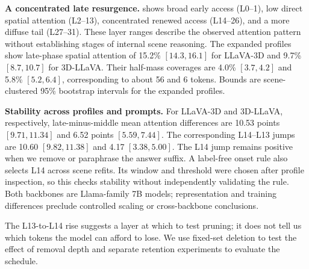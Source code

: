 \textbf{A concentrated late resurgence.}  shows broad early access (L0--1), low direct spatial attention (L2--13), concentrated renewed access (L14--26), and a more diffuse tail (L27--31). These layer ranges describe the observed attention pattern without establishing stages of internal scene reasoning. The expanded profiles show late-phase spatial attention of 15.2\% $[14.3,16.1]$ for LLaVA-3D and 9.7\% $[8.7,10.7]$ for 3D-LLaVA. Their half-mass coverages are 4.0\% $[3.7,4.2]$ and 5.8\% $[5.2,6.4]$, corresponding to about 56 and 6 tokens. Bounds are scene-clustered 95\% bootstrap intervals for the expanded profiles.

\textbf{Stability across profiles and prompts.} For LLaVA-3D and 3D-LLaVA, respectively, late-minus-middle mean attention differences are 10.53 points $[9.71,11.34]$ and 6.52 points $[5.59,7.44]$. The corresponding L14--L13 jumps are 10.60 $[9.82,11.38]$ and 4.17 $[3.38,5.00]$. The L14 jump remains positive when we remove or paraphrase the answer suffix. A label-free onset rule also selects L14 across scene refits. Its window and threshold were chosen after profile inspection, so this checks stability without independently validating the rule. Both backbones are Llama-family 7B models; representation and training differences preclude controlled scaling or cross-backbone conclusions.

The L13-to-L14 rise suggests a layer at which to test pruning; it does not tell us which tokens the model can afford to lose. We use fixed-set deletion to test the effect of removal depth and separate retention experiments to evaluate the schedule.

